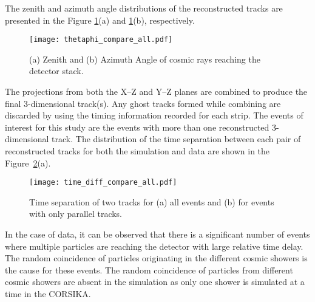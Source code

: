 The zenith and azimuth angle distributions of the reconstructed
tracks are presented in the Figure \ref{fig:thetaphi}(a) and
\ref{fig:thetaphi}(b), respectively.
\begin{figure}[h]
  \texttt{[image: thetaphi\_compare\_all.pdf]} 
  \caption{(a) Zenith and (b) Azimuth Angle of cosmic rays
    reaching the detector 
stack.}
  \label{fig:thetaphi}
\end{figure}
The projections from both the X--Z and Y--Z planes are combined
to produce the final 3-dimensional track(s). Any ghost tracks formed
while combining are discarded by using the timing information recorded
for each strip. The events of interest for this study are the
events with more than one reconstructed 3-dimensional track.
The distribution of the time separation between each pair of
reconstructed tracks for both the simulation and data are shown in the
Figure~\ref{fig:time_sep}(a).
\begin{figure}[h]
  \texttt{[image: time\_diff\_compare\_all.pdf]} 
  \caption{Time separation of two tracks for (a) all events and
    (b) for events with only parallel tracks.}
  \label{fig:time_sep}
\end{figure}
In the case of data, it can be observed that there is a significant
number of events where multiple particles are reaching the detector
with large relative time delay. The random coincidence of particles
originating in the different cosmic showers is the cause for these
events. The random coincidence of particles from different cosmic
showers are absent in the simulation as only one shower is simulated
at a time in the CORSIKA.

